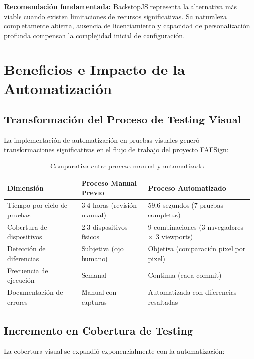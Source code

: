 \documentclass{article}
\begin{document}
\textbf{Recomendación fundamentada:} BackstopJS representa la alternativa más viable cuando existen limitaciones de recursos significativas. Su naturaleza completamente abierta, ausencia de licenciamiento y capacidad de personalización profunda compensan la complejidad inicial de configuración.

\section{Beneficios e Impacto de la Automatización}

\subsection{Transformación del Proceso de Testing Visual}

La implementación de automatización en pruebas visuales generó transformaciones significativas en el flujo de trabajo del proyecto FAESign:

\begin{table}[H]
\centering
\begin{tabular}{|p{3.5cm}|p{5.5cm}|p{5.5cm}|}
\hline
\textbf{Dimensión} & \textbf{Proceso Manual Previo} & \textbf{Proceso Automatizado} \\
\hline
Tiempo por ciclo de pruebas & 3-4 horas (revisión manual) & 59.6 segundos (7 pruebas completas) \\
\hline
Cobertura de dispositivos & 2-3 dispositivos físicos & 9 combinaciones (3 navegadores × 3 viewports) \\
\hline
Detección de diferencias & Subjetiva (ojo humano) & Objetiva (comparación pixel por pixel) \\
\hline
Frecuencia de ejecución & Semanal & Continua (cada commit) \\
\hline
Documentación de errores & Manual con capturas & Automatizada con diferencias resaltadas \\
\hline
\end{tabular}
\caption{Comparativa entre proceso manual y automatizado}
\label{tab:automation-impact}
\end{table}

\subsection{Incremento en Cobertura de Testing}

La cobertura visual se expandió exponencialmente con la automatización:
\end{document}
